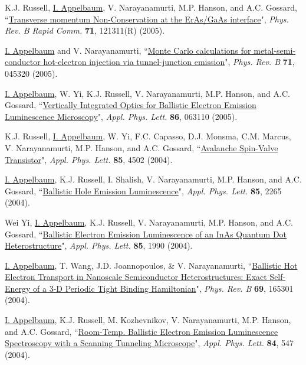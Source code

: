 \documentclass[paper=letter,fontsize=11pt]{scrartcl} %
\newcommand{\PaperEntry}[7]{
		\noindent #1, ``\href{#7}{#2}", \textit{#3} \textbf{#4}, #5 (#6).}
\begin{document}
\begin{etaremune}
\item\PaperEntry{K.J. Russell, \underline{I. Appelbaum}, V. Narayanamurti, M.P. Hanson, and A.C. Gossard}{Transverse momentum Non-Conservation at the ErAs/GaAs interface}{Phys. Rev. B Rapid Comm.}{71}{121311(R)}{2005}{http://dx.doi.org/10.1103/PhysRevB.71.121311} 

\item\PaperEntry{\underline{I. Appelbaum} and V. Narayanamurti}{Monte Carlo calculations for metal-semi-conductor hot-electron injection via tunnel-junction emission}{Phys. Rev. B}{71}{045320}{2005}{http://dx.doi.org/10.1103/PhysRevB.71.045320}

\item\PaperEntry{\underline{I. Appelbaum}, W. Yi, K.J. Russell, V. Narayanamurti, M.P. Hanson, and A.C. Gossard}{Vertically Integrated Optics for Ballistic Electron Emission Luminescence Microscopy}{Appl. Phys. Lett.}{86}{063110}{2005}{http://dx.doi.org/10.1063/1.1861961}

\item\PaperEntry{K.J. Russell, \underline{I. Appelbaum}, W. Yi, F.C. Capasso, D.J. Monsma, C.M. Marcus, V. Narayanamurti, M.P. Hanson, and A.C. Gossard}{Avalanche Spin-Valve Transistor}{Appl. Phys. Lett.}{85}{4502}{2004}{http://dx.doi.org/10.1063/1.1818339}

\item\PaperEntry{\underline{I. Appelbaum}, K.J. Russell, I. Shalish, V. Narayanamurti, M.P. Hanson, and A.C. Gossard}{Ballistic Hole Emission Luminescence}{Appl. Phys. Lett.}{85}{2265}{2004}{http://dx.doi.org/10.1063/1.1793347}

\item\PaperEntry{Wei Yi, \underline{I. Appelbaum}, K.J. Russell, V. Narayanamurti, M.P. Hanson, and A.C. Gossard}{Ballistic Electron Emission Luminescence of an InAs Quantum Dot Heterostructure}{Appl. Phys. Lett.}{85}{1990}{2004}{http://dx.doi.org/10.1063/1.1790595}

\item\PaperEntry{\underline{I. Appelbaum}, T. Wang, J.D. Joannopoulos, \& V. Narayanamurti}{Ballistic Hot Electron Transport in Nanoscale Semiconductor Heterostructures: Exact Self-Energy of a 3-D Periodic Tight Binding Hamiltonian}{Phys. Rev. B}{69}{165301}{2004}{http://dx.doi.org/10.1103/PhysRevB.69.165301} 

\item\PaperEntry{\underline{I. Appelbaum}, K.J. Russell, M. Kozhevnikov, V. Narayanamurti, M.P. Hanson, and A.C. Gossard}{Room-Temp. Ballistic Electron Emission Luminescence Spectroscopy with a Scanning Tunneling Microscope}{Appl. Phys. Lett.}{84}{547}{2004}{http://dx.doi.org/10.1063/1.1644329}


\end{etaremune}
\end{document}
